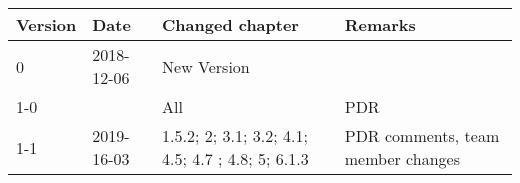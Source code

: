\begin{longtable}{|p{1.5cm}|p{2cm}|p{6cm}|p{3cm}|}\hline
\centering
\textbf{Version} & \textbf{Date} & \textbf{Changed chapter} & \textbf{Remarks}  \\\hline
0       & 2018-12-06 	& New Version 	&          				\\\hline
1-0   	&  				& All         	& PDR      				\\\hline

1-1		& 2019-16-03	& 1.5.2; 2; 3.1; 3.2; 4.1; 4.5; 4.7 ; 4.8; 5; 6.1.3		& PDR comments, team member changes 			\\\hline

\end{longtable}           